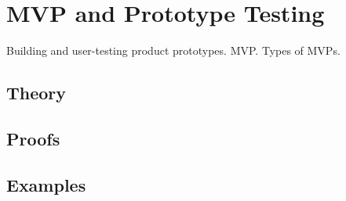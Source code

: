 
\section{MVP and Prototype Testing}
\label{sec:2.6.15-mvp-prototypes}

\begin{ticket}
Building and user-testing product prototypes. MVP. Types of MVPs.
\end{ticket}

\subsection*{Theory}

\subsection*{Proofs}

\subsection*{Examples}
